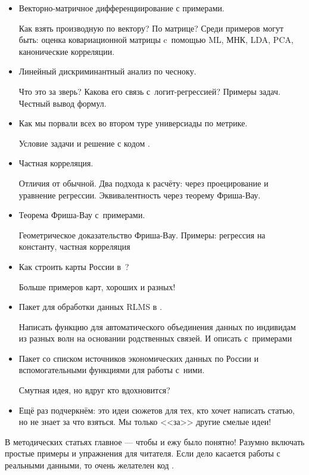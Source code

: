 \documentclass[11pt]{article}
\begin{document}
\begin{itemize}
\item Векторно-матричное дифференциирование с примерами. 

Как взять производную по вектору? По матрице? Среди примеров могут быть: оценка  ковариационной матрицы c~помощью ML, МНК, LDA, PCA, канонические корреляции.
\item Линейный дискриминантный анализ по чесноку. 

Что это за зверь? Какова его связь с~логит-регрессией? Примеры задач. Честный вывод формул. 

\item Как мы порвали всех во втором туре универсиады по метрике. 

Условие задачи и решение с кодом .

\item Частная корреляция. 

Отличия от обычной. Два подхода к расчёту: через проецирование и уравнение регрессии. Эквивалентность через теорему Фриша-Вау.

\item Теорема Фриша-Вау с~примерами.

Геометрическое доказательство Фриша-Вау. Примеры: регрессия на константу, частная корреляция

\item Как строить карты России в~?

Больше примеров карт, хороших и разных!

\item Пакет для обработки данных RLMS в .

Написать функцию для автоматического объединения данных по индивидам из разных волн на основании родственных связей. И описать с~примерами

\item Пакет со списком источников экономических данных по России и вспомогательными функциями для работы с~ними.

Смутная идея, но вдруг кто вдохновится?


\item Ещё раз подчеркнём: это идеи сюжетов для тех, кто хочет написать статью, но не знает за что взяться. Мы только <<за>> другие смелые идеи!

\end{itemize}



В методических статьях главное --- чтобы и ежу было понятно! Разумно включать простые примеры и упражнения для читателя. Если дело касается работы с реальными данными, то очень желателен код .
\end{document}

